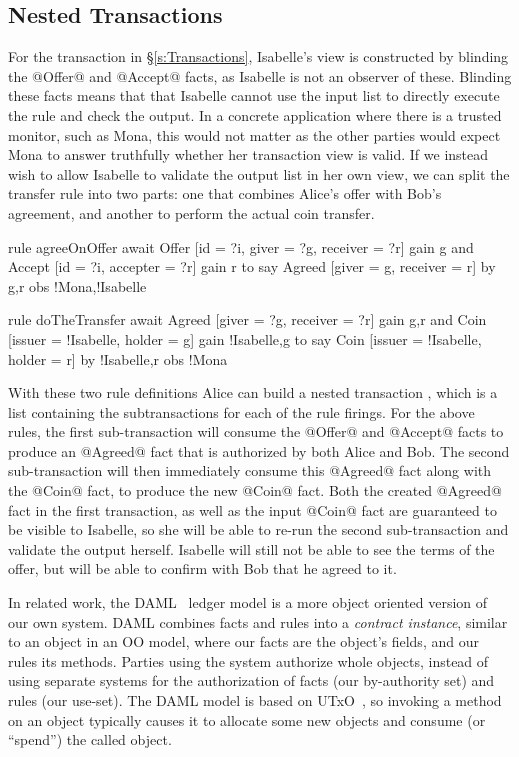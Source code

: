 \subsection{Nested Transactions}
\label{s:NestedTransactions}
For the transaction in \S\ref{s:Transactions}, Isabelle's view is constructed by blinding the @Offer@ and @Accept@ facts, as Isabelle is not an observer of these. Blinding these facts means that that Isabelle cannot use the input list to directly execute the rule and check the output. In a concrete application where there is a trusted monitor, such as Mona, this would not matter as the other parties would expect Mona to answer truthfully whether her transaction view is valid. If we instead wish to allow Isabelle to validate the output list in her own view, we can split the transfer rule into two parts: one that combines Alice's offer with Bob's agreement, and another to perform the actual coin transfer.

\begin{small}
\begin{code}
  rule  agreeOnOffer
  await Offer  [id = ?i, giver = ?g, receiver = ?r] gain {g}
    and Accept [id = ?i, accepter = ?r]             gain {r}
  to
    say Agreed [giver = g, receiver = r]
     by {g,r}  obs {!Mona,!Isabelle}

  rule  doTheTransfer
  await Agreed [giver = ?g, receiver = ?r]        gain {g,r}
   and  Coin   [issuer = !Isabelle, holder = g]
        gain {!Isabelle,g}
  to
    say Coin   [issuer = !Isabelle, holder = r]
     by {!Isabelle,r} obs {!Mona}
\end{code}
\end{small}

With these two rule definitions Alice can build a nested transaction \CITE, which is a list containing the subtransactions for each of the rule firings. For the above rules, the first sub-transaction will consume the @Offer@ and @Accept@ facts to produce an @Agreed@ fact that is authorized by both Alice and Bob. The second sub-transaction will then immediately consume this @Agreed@ fact along with the @Coin@ fact, to produce the new @Coin@ fact. Both the created @Agreed@ fact in the first transaction, as well as the input @Coin@ fact are guaranteed to be visible to Isabelle, so she will be able to re-run the second sub-transaction and validate the output herself. Isabelle will still not be able to see the terms of the offer, but will be able to confirm with Bob that he agreed to it.

In related work, the DAML~\cite{DA2019:DAML} ledger model is a more object oriented version of our own system. DAML combines facts and rules into a \emph{contract instance}, similar to an object in an OO model, where our facts are the object's fields, and our rules its methods. Parties using the system authorize whole objects, instead of using separate systems for the authorization of facts (our by-authority set) and rules (our use-set). The DAML model is based on UTxO~\cite{Zahnentferner2018:UTxO}, so invoking a method on an object typically causes it to allocate some new objects and consume (or ``spend'') the called object.

